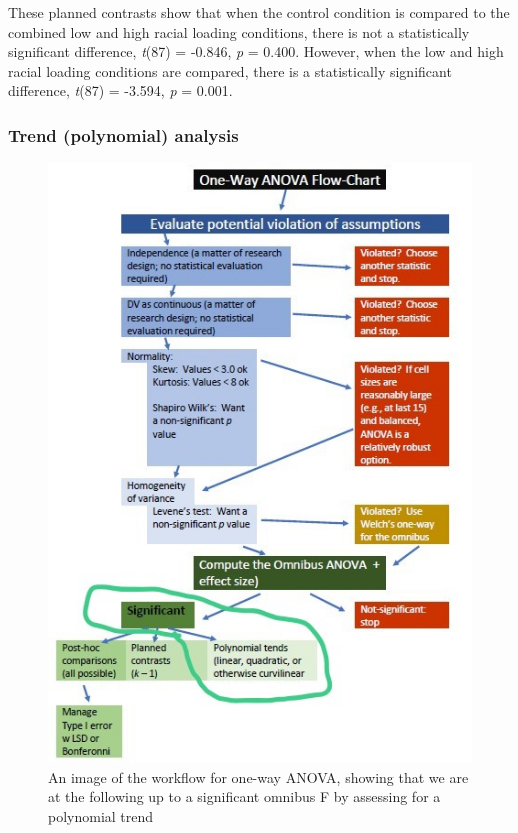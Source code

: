 \documentclass[
  english,
]{book}
\newenvironment{Shaded}{\begin{snugshade}}{\end{snugshade}}
\newcommand{\DecValTok}[1]{\textcolor[rgb]{0.00,0.00,0.81}{#1}}
\newcommand{\KeywordTok}[1]{\textcolor[rgb]{0.13,0.29,0.53}{\textbf{#1}}}
\newcommand{\NormalTok}[1]{#1}
\newcommand{\OperatorTok}[1]{\textcolor[rgb]{0.81,0.36,0.00}{\textbf{#1}}}
\begin{document}
\begin{Shaded}
\end{Shaded}

These planned contrasts show that when the control condition is compared to the combined low and high racial loading conditions, there is not a statistically significant difference, \emph{t}(87) = -0.846, \emph{p} = 0.400. However, when the low and high racial loading conditions are compared, there is a statistically significant difference, \emph{t}(87) = -3.594, \emph{p} = 0.001.

\hypertarget{trend-polynomial-analysis}{%
\subsubsection{Trend (polynomial) analysis}\label{trend-polynomial-analysis}}

\begin{figure}
\centering
\includegraphics{images/OnewayWrkFlw_poly.jpg}
\caption{An image of the workflow for one-way ANOVA, showing that we are at the following up to a significant omnibus F by assessing for a polynomial trend}
\end{figure}
\end{document}
